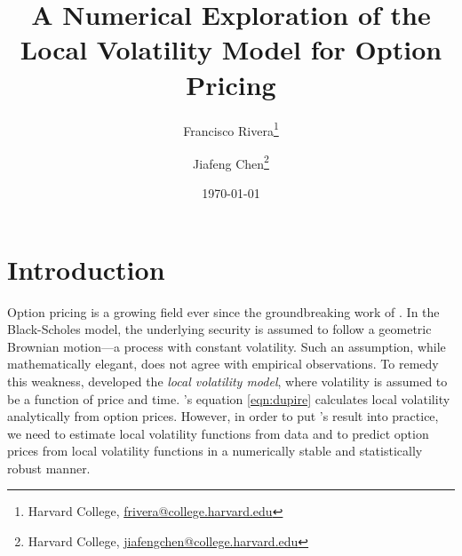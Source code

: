 \documentclass[11pt]{article}
\numberwithin{equation}{section}
\begin{document}
\title{A Numerical Exploration of the Local Volatility Model for Option Pricing}
\author{Francisco Rivera\thanks{Harvard College, 
\href{mailto:frivera@college.harvard.edu}{frivera@college.harvard.edu} 
} \and Jiafeng Chen\thanks{Harvard College,
\href{mailto:jiafengchen@college.harvard.edu}{jiafengchen@college.harvard.edu}}}
\date{\today}

\maketitle




\section{Introduction}

Option pricing is a growing field ever since the groundbreaking work of
\cite{black1973pricing}. In the Black-Scholes model, the underlying security is
assumed to follow a geometric Brownian motion---a process with constant
volatility. Such an assumption, while mathematically elegant, does not agree
with empirical observations. To remedy this weakness, \cite{dupire1997pricing}
developed the \emph{local volatility model}, where volatility is assumed to be a
function of price and time. \cite{dupire1997pricing}'s equation
\eqref{eqn:dupire} calculates local volatility analytically from option prices.
However, in order to put \cite{dupire1997pricing}'s result into practice, we
need to estimate local volatility functions from data and to predict option
prices from local volatility functions in a numerically stable and statistically
robust manner.
\end{document}

